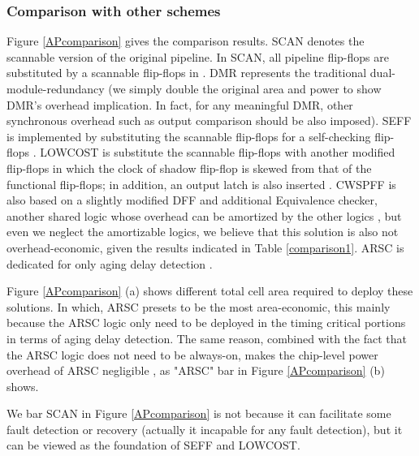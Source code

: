 \begin{figure*}[!t]
\centering {}
\caption{Comparison with other solutions in terms of cell area and power,
$L_{xor}=4$, $L_{and}=5$, $BW=8$.} \label{APcomparison}
\end{figure*}

\subsubsection{Comparison with other schemes}
Figure \ref{APcomparison} gives the comparison results. SCAN denotes the scannable version of the original pipeline. In SCAN, all pipeline flip-flops are substituted by a scannable flip-flops in \cite{Mitra_C05}. DMR represents the traditional dual-module-redundancy (we simply double the original area and power to show DMR's overhead implication. In fact, for any meaningful DMR, other synchronous overhead such as output comparison should be also imposed). SEFF is implemented by substituting the scannable flip-flops for a self-checking flip-flops \cite{Mitra_C05}. LOWCOST is substitute the scannable flip-flops with another modified flip-flops in which the clock of shadow flip-flop is skewed from that of the functional flip-flops; in addition, an output latch is also inserted \cite{lowcost_date07}. CWSPFF is also based on a slightly modified DFF and additional Equivalence checker, another shared logic whose overhead can be amortized by the other logics \cite{CWSP_DATE08}, but even we neglect the amortizable logics, we believe that this solution is also not overhead-economic, given the results indicated in Table \ref{comparison1}. ARSC is dedicated for only aging delay detection \cite{agarwal2007circuit}.

Figure \ref{APcomparison} (a) shows different total cell area required to deploy these solutions. In which, ARSC presets to be the most area-economic, this mainly because the ARSC logic only need to be deployed in the timing critical portions in terms of aging delay detection. The same reason, combined with the fact that the ARSC logic does not need to be always-on, makes the chip-level power overhead of ARSC negligible \cite{agarwal2007circuit}, as "ARSC" bar in Figure \ref{APcomparison} (b) shows.

We bar SCAN in Figure \ref{APcomparison} is not because it can facilitate some fault detection or recovery (actually it incapable for any fault detection), but it can be viewed as the foundation of SEFF and LOWCOST.

